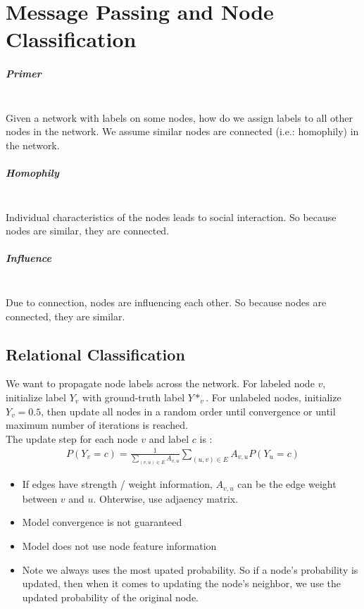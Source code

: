 \chapter{Message Passing and Node Classification}
\paragraph{Primer}\mbox{}\\
Given a network with labels on some nodes, how do we assign labels to all other nodes in the network. We assume similar nodes are connected (i.e.: homophily) in the network. \\

\paragraph{Homophily}\mbox{}\\
Individual characteristics of the nodes leads to social interaction. So because nodes are similar, they are connected. 

\paragraph{Influence} \mbox{}\\
Due to connection, nodes are influencing each other. So because nodes are connected, they are similar. 


\section{Relational Classification}
We want to propagate node labels across the network. For labeled node $v$, initialize label $Y_v$ with ground-truth label $Y*_v$. For unlabeled nodes, initialize $Y_v = 0.5$, then update all nodes in a random order until convergence or until maximum number of iterations is reached. \\
The update step for each node $v$ and label $c$ is :
    \begin{align*}
        P(Y_v = c) = \frac{1}{\sum_{(v,u)\in E} A_{v,u}} \sum_{(u,v)\in E}A_{v,u}P(Y_u = c)
    \end{align*}
    \begin{itemize}
        \item If edges have strength / weight information, $A_{v,u}$ can be the edge weight between $v$ and $u$. Ohterwise, use adjaency matrix. 
        \item Model convergence is not guaranteed
        \item Model does not use node feature information 
        \item Note we always uses the most upated probability. So if a node's probability is updated, then when it comes to updating the node's neighbor, we use the updated probability of the original node. 
    \end{itemize}


